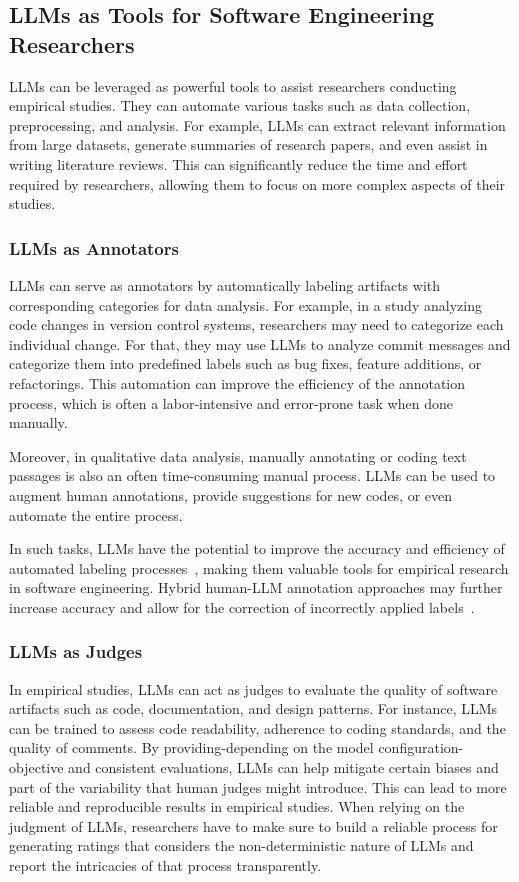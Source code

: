 \documentclass[11pt]{article}
\begin{document}
\subsection{LLMs as Tools for Software Engineering Researchers}

LLMs can be leveraged as powerful tools to assist researchers conducting empirical studies.
They can automate various tasks such as data collection, preprocessing, and analysis.
For example, LLMs can extract relevant information from large datasets, generate summaries of research papers, and even assist in writing literature reviews.
This can significantly reduce the time and effort required by researchers, allowing them to focus on more complex aspects of their studies.

\subsubsection{LLMs as Annotators}

LLMs can serve as annotators by automatically labeling artifacts with corresponding categories for data analysis.
For example, in a study analyzing code changes in version control systems, researchers may need to categorize each individual change.
For that, they may use LLMs to analyze commit messages and categorize them into predefined labels such as bug fixes, feature additions, or refactorings.
This automation can improve the efficiency of the annotation process, which is often a labor-intensive and error-prone task when done manually.

Moreover, in qualitative data analysis, manually annotating or coding text passages is also an often time-consuming manual process.
LLMs can be used to augment human annotations, provide suggestions for new codes, or even automate the entire process.

In such tasks, LLMs have the potential to improve the accuracy and efficiency of automated labeling processes~\cite{DBLP:conf/kdd/WanSJKCNSSWYABJ24}, making them valuable tools for empirical research in software engineering.
Hybrid human-LLM annotation approaches may further increase accuracy and allow for the correction of incorrectly applied labels~\cite{DBLP:conf/chi/Wang0RMM24}.

\subsubsection{LLMs as Judges}

In empirical studies, LLMs can act as judges to evaluate the quality of software artifacts such as code, documentation, and design patterns. 
For instance, LLMs can be trained to assess code readability, adherence to coding standards, and the quality of comments. 
By providing-depending on the model configuration-objective and consistent evaluations, LLMs can help mitigate certain biases and part of the variability that human judges might introduce. 
This can lead to more reliable and reproducible results in empirical studies.
When relying on the judgment of LLMs, researchers have to make sure to build a reliable process for generating ratings that considers the non-deterministic nature of LLMs and report the intricacies of that process transparently.
\end{document}
